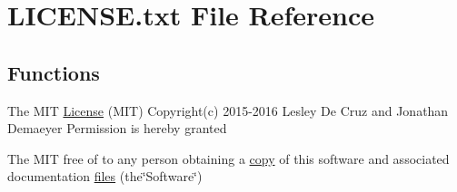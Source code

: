\hypertarget{LICENSE_8txt}{}\section{L\+I\+C\+E\+N\+S\+E.\+txt File Reference}
\label{LICENSE_8txt}
\subsection*{Functions}
\begin{DoxyCompactItemize}
\item 
The M\+IT \hyperlink{LICENSE_8txt_a5265396c41b42f76bb8ac88275c2535e}{License} (M\+IT) Copyright(c) 2015-\/2016 Lesley De Cruz and Jonathan Demaeyer Permission is hereby granted
\item 
The M\+IT free of to any person obtaining a \hyperlink{LICENSE_8txt_aff1d4c6b756ebf691fa44a0904f68658}{copy} of this software and associated documentation \hyperlink{LICENSE_8txt_abdb4f4971cf029244bb81834ee9b393d}{files} (the\char`\"{}Software\char`\"{})
\end{DoxyCompactItemize}
